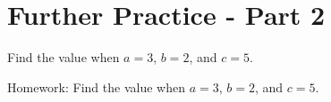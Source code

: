 
\section*{Further Practice - Part 2}

\question Find the value when \( a = 3 \), \( b = 2 \), and \( c = 5 \).

\begin{multicols}{2}
\end{multicols} \ms
\newpage
\question Homework: Find the value when \( a = 3 \), \( b = 2 \), and \( c = 5 \).

